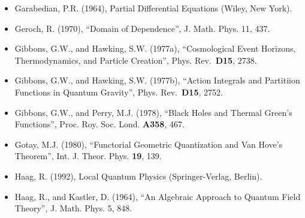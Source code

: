 \documentclass[11pt,a4paper]{article}
\begin{document}
\begin{itemize}
  Fulling, S.A., Sweeny, M., and Wald, R.M. (1978), ``Singularity Structure of the Two-Point Function in Quantum Field Theory in Curved Spacetime'', Commun. Math. Phys. \textbf{63}, 257.
\item
  Garabedian, P.R. (1964), Partial Differential Equations (Wiley, New York).
\item
  Geroch, R. (1970), ``Domain of Dependence'', J. Math. Phys. 11, 437.
\item
  Gibbons, G.W., and Hawking, S.W. (1977a), ``Cosmological Event Horizons, Thermodynamics, and Particle Creation'', Phys. Rev.~\textbf{D15}, 2738.
\item
  Gibbons, G.W., and Hawking, S.W. (1977b), ``Action Integrals and Partitiion Functions in Quantum Gravity'', Phys. Rev.~\textbf{D15}, 2752.
\item
  Gibbons, G.W., and Perry, M.J. (1978), ``Black Holes and Thermal Green's Functions'', Proc. Roy. Soc. Lond. \textbf{A358}, 467.
\item
  Gotay, M.J. (1980), ``Functorial Geometric Quantization and Van Hove's Theorem'', Int. J. Theor. Phys. \textbf{19}, 139.
\item
  Haag, R. (1992), Local Quantum Physics (Springer-Verlag, Berlin).
\item
  Haag, R., and Kastler, D. (1964), ``An Algebraic Approach to Quantum Field Theory'', J. Math. Phys. 5, 848.
\end{itemize}

\hypertarget{source-210}{}
\end{document}
